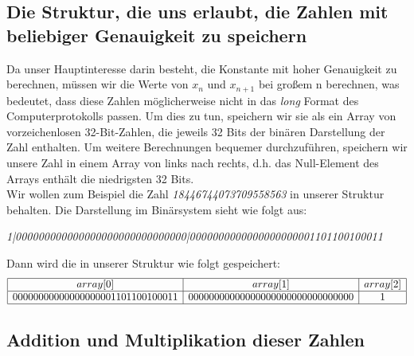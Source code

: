 \documentclass[course=erap]{aspdoc}
\begin{document}
\subsection{Die Struktur, die uns erlaubt, die Zahlen mit beliebiger Genauigkeit zu speichern}%
Da unser Hauptinteresse darin besteht, die Konstante mit hoher Genauigkeit zu berechnen, müssen wir die Werte von $x_n$ und $x_{n+1}$ bei großem n berechnen, was bedeutet, dass diese Zahlen möglicherweise nicht in das \textit{long} Format des Computerprotokolls passen. Um dies zu tun, speichern wir sie als ein Array von vorzeichenlosen 32-Bit-Zahlen, die jeweils 32 Bits der binären Darstellung der Zahl enthalten. Um weitere Berechnungen bequemer durchzuführen, speichern wir unsere Zahl in einem Array von links nach rechts, d.h. das Null-Element des Arrays enthält die niedrigsten 32 Bits.\\
Wir wollen zum Beispiel die Zahl \textit{18446744073709558563} in unserer Struktur behalten. Die Darstellung im Binärsystem sieht wie folgt aus: \\
\centerline{\textit{1|000000000000000000000000000000|0000000000000000000001101100100011}}
Dann wird die in unserer Struktur wie folgt gespeichert:
\begin{equation*}
\begin{array}{|c|c|c|}\hline
array[0] & array[1] & array[2]\\
\hline
00000000000000000001101100100011 & 00000000000000000000000000000000 & 1 \\
\hline
\end{array}
\end{equation*}
\subsection{Addition und Multiplikation dieser Zahlen}%
\end{document}
